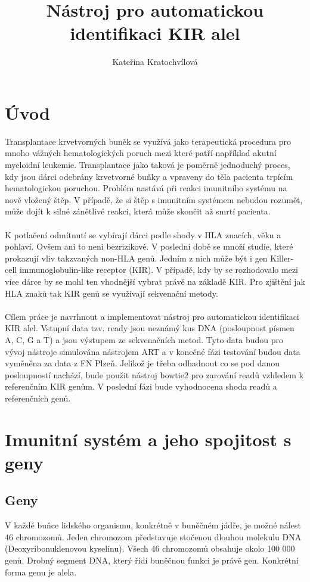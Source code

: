 \documentclass[czech,DP]{thesiskiv}
\author{Kateřina Kratochvílová}
\title{Nástroj pro automatickou identifikaci KIR alel}
\numberwithin{equation}{section}
\begin{document}
%
\maketitle
\tableofcontents

\chapter{Úvod}
Transplantace krvetvorných buněk se využívá jako terapeutická procedura pro mnoho vážných hematologických poruch mezi které patří například akutní myeloidní leukemie. Transplantace jako taková je poměrně jednoduchý proces, kdy jsou dárci odebrány krvetvorné buňky a vpraveny do těla pacienta trpícím hematologickou poruchou. Problém nastává při reakci imunitního systému na nově vložený štěp. V případě, že si štěp s imunitním systémem nebudou rozumět, může dojít k silné zánětlivé reakci, která může skončit až smrtí pacienta. 
\\
\\
K potlačení odmítnutí se vybírají dárci podle shody v HLA znacích, věku a pohlaví. Ovšem ani to neni bezrizikové. V poslední době se množí studie, které prokazují vliv takzvaných non-HLA genů. Jedním z nich může být i gen Killer-cell immunoglobulin-like receptor (KIR). V případě, kdy by se rozhodovalo mezi více dárce by se mohl ten vhodnější vybrat právě na základě KIR. Pro zjištění jak HLA znaků tak KIR genů se využívají sekvenační metody. \citep{KIR_transplantace_jindra} 
\\
\\
Cílem práce je navrhnout a implementovat nástroj pro automatickou identifikaci KIR alel. Vstupní data tzv. ready jsou neznámý kus DNA (posloupnost písmen A, C, G a T) a jsou výstupem ze sekvenačních metod. Tyto data budou pro vývoj nástroje simulována nástrojem ART a v konečné fázi testování budou data vyměněna za data z FN Plzeň. Jelikož je třeba odhadnout co se pod danou posloupností nachází, bude použit nástroj bowtie2 pro zarování readů vzhledem k referenčním KIR genům. V poslední fázi bude vyhodnocena shoda readů a referenčních genů.

\chapter{Imunitní systém a jeho spojitost s geny}
\section{Geny}
V každé buňce lidského organismu, konkrétně v buněčném jádře, je možné nálest 46 chromozomů. Jeden chromozom představuje stočenou dlouhou molekulu DNA (Deoxyribonuklenovou kyselinu). Všech 46 chromozomů obsahuje okolo 100 000 genů. Drobný segment DNA, který řídí buněčnou funkci je právě gen. Konkrétní forma genu je alela. \citep{en_smith}
\end{document}
